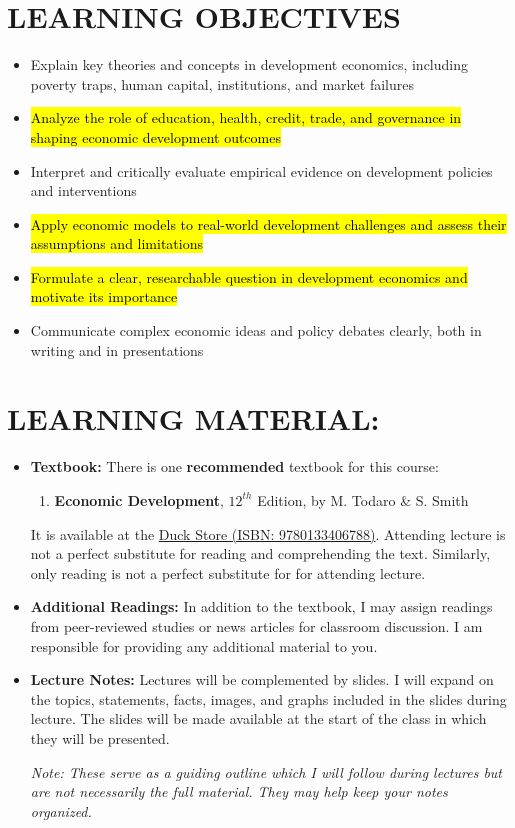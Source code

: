 \documentclass[11pt]{article}
\begin{document}
\section*{LEARNING OBJECTIVES}
\begin{itemize}
    \item Explain key theories and concepts in development economics, including poverty traps, human capital, institutions, and market failures
    \item \hl{Analyze the role of education, health, credit, trade, and governance in shaping economic development outcomes}
    \item Interpret and critically evaluate empirical evidence on development policies and interventions
    \item \hl{Apply economic models to real-world development challenges and assess their assumptions and limitations}
    \item \hl{Formulate a clear, researchable question in development economics and motivate its importance}
    \item Communicate complex economic ideas and policy debates clearly, both in writing and in presentations
\end{itemize}

\section*{LEARNING MATERIAL:}
\begin{itemize}
    \item \textbf{Textbook:} There is one \textbf{recommended} textbook for this course:
        \begin{enumerate}
            \item \textbf{Economic Development}, $12^{th}$ Edition, by M. Todaro \& S. Smith
        \end{enumerate}
    It is available at the \href{https://www.uoduckstore.com/book-search-results?crn=11737&term=202501}{Duck Store (ISBN: 9780133406788)}.
    Attending lecture is not a perfect substitute for reading and comprehending the text. 
    Similarly, only reading is not a perfect substitute for for attending lecture. 
    \item \textbf{Additional Readings:} In addition to the textbook, I may assign readings from peer-reviewed studies or news articles for classroom discussion. 
    I am responsible for providing any additional material to you.
    \item \textbf{Lecture Notes:} Lectures will be complemented by slides.
    I will expand on the topics, statements, facts, images, and graphs included in the slides during lecture. 
    The slides will be made available at the start of the class in which they will be presented. 
    
    \emph{Note: These serve as a guiding outline which I will follow during lectures but are not necessarily the full material. They may help keep your notes organized.}
\end{itemize}
\end{document}

